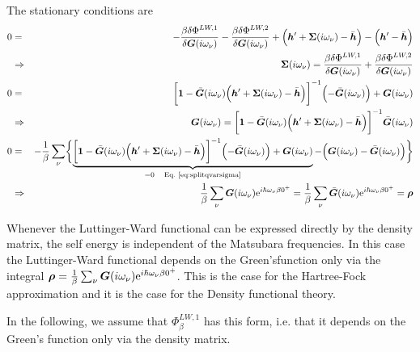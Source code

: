 \documentclass[11pt,a4paper]{report}
\begin{document}
The stationary conditions are
\begin{eqnarray}
0&=&-\frac{\beta\delta\Phi^{LW,1}}{\delta\mat{G}(i\omega_\nu)}
-\frac{\beta\delta\Phi^{LW,2}}{\delta\mat{G}(i\omega_\nu)}
+\Bigl(\mat{h}'+\mat{\Sigma}(i\omega_\nu)-\bar{\mat{h}}\Bigr)
-\Bigl(\mat{h}'-\bar{\mat{h}}\Bigr)
\nonumber\\
&\Rightarrow&\qquad
\mat{\Sigma}(i\omega_\nu)
=\frac{\beta\delta\Phi^{LW,1}}{\delta\mat{G}(i\omega_\nu)}
+\frac{\beta\delta\Phi^{LW,2}}{\delta\mat{G}(i\omega_\nu)}
\nonumber\\
0&=&\biggl[\mat{1}-\bar{\mat{G}}(i\omega_\nu)
\Bigl(\mat{h}'+\mat{\Sigma}(i\omega_\nu)-\bar{\mat{h}}\Bigr)\biggr]^{-1}
\Bigl(-\bar{\mat{G}}(i\omega_\nu)\Bigr)+\mat{G}(i\omega_\nu)
\label{eq:splitqvarsigma}
\\
&\Rightarrow&\qquad
\mat{G}(i\omega_\nu)=\biggl[\mat{1}-\bar{\mat{G}}(i\omega_\nu)
\Bigl(\mat{h}'
+\mat{\Sigma}(i\omega_\nu)-\bar{\mat{h}}\Bigr)\biggr]^{-1}
\bar{\mat{G}}(i\omega_\nu)
\nonumber\\
0&=&
-\frac{1}{\beta}\sum_\nu\biggl\lbrace
\underbrace{\biggl[\mat{1}-\bar{\mat{G}}(i\omega_\nu)
\Bigl(\mat{h}'+\mat{\Sigma}(i\omega_\nu)-\bar{\mat{h}}\Bigr)\biggr]^{-1}
\Bigl(-\bar{\mat{G}}(i\omega_\nu)\Bigr)+\mat{G}(i\omega_\nu)}
_{=0\quad\text{\eq{eq:splitqvarsigma}}}
-\Bigl(\mat{G}(i\omega_\nu)
-\bar{\mat{G}}(i\omega_\nu)\Bigr)\biggr\rbrace
\nonumber\\
&\Rightarrow&\qquad
\frac{1}{\beta}\sum_\nu
\mat{G}(i\omega_\nu)\e{i\hbar\omega_\nu\beta0^+}
=\frac{1}{\beta}\sum_\nu
\bar{\mat{G}}(i\omega_\nu)\e{i\hbar\omega_\nu\beta0^+}
=\mat{\rho}
\end{eqnarray}

Whenever the Luttinger-Ward functional can be expressed directly by
the density matrix, the self energy is independent of the Matsubara
frequencies. In this case the Luttinger-Ward functional depends on the
Green'sfunction only via the integral $\bm{\rho}=
\frac{1}{\beta}\sum_\nu
\bm{G}(i\omega_\nu)\mathrm{e}^{i\hbar\omega_\nu\beta0^+}$. This is the case
for the Hartree-Fock approximation and it is the case for the Density
functional theory.

In the following, we assume that $\Phi^{LW,1}_\beta$ has this form,
i.e. that it depends on the Green's function only via the density
matrix.

\end{document}
